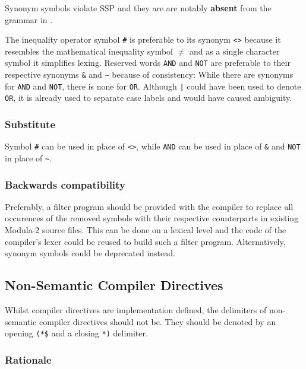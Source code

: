 \documentclass[10pt,a4paper]{article} %
\begin{document}
Synonym symbols violate SSP and they are are notably \textbf{absent} from the grammar in \cite{Wirth88}.

The inequality operator symbol \verb|#| is preferable to its synonym \verb|<>| because it resembles the mathematical inequality symbol $\neq$ and as a single character symbol it simplifies lexing. Reserved words \verb|AND| and \verb|NOT| are preferable to their respective synonyms \verb|&| and \verb|~| because of consistency: While there are synonyms for \verb|AND| and \verb|NOT|, there is none for \verb|OR|. Although \verb!|! could have been used to denote \verb|OR|, it is already used to separate case labels and would have caused ambiguity.

\subsubsection{Substitute}

Symbol \verb|#| can be used in place of \verb|<>|, while \verb|AND| can be used in place of \verb|&| and \verb|NOT| in place of \verb|~|.

\subsubsection{Backwards compatibility}

Preferably, a filter program should be provided with the compiler to replace all occurences of the removed symbols with their respective counterparts in existing Modula-2 source files. This can be done on a lexical level and the code of the compiler's lexer could be reused to build such a filter program. Alternatively, synonym symbols could be deprecated instead.


\subsection{Non-Semantic Compiler Directives}

Whilst \glspl{compiler directive} are implementation defined, the delimiters of \glspl{non-semantic compiler directive} should not be. They should be denoted by an opening \verb|(*$| and a closing \verb|*)| delimiter.

\subsubsection{Rationale}
\end{document}
